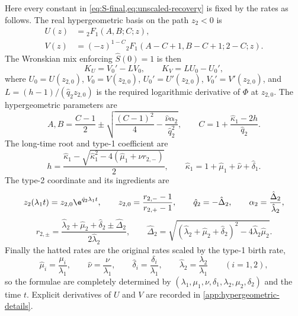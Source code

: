 \FloatBarrier

\begin{remark}
\label{note:parameter-map}
Here every constant in \cref{eq:S-final,eq:unscaled-recovery} is fixed by the rates as follows. The real hypergeometric basis on the path $z_2<0$ is
\begin{equation*}
\begin{aligned}
U(z)&={}_2F_1(A,B;C;z),\\
V(z)&=(-z)^{1-C}
{}_2F_1(A-C+1,B-C+1;2-C;z).
\end{aligned}
\end{equation*}
The Wronskian mix enforcing $\widehat S(0)=1$ is then
\begin{equation*}
K_U=V_0'-L V_0,
\qquad
K_V=L U_0-U_0',
\end{equation*}
where $U_0=U(z_{2,0})$, $V_0=V(z_{2,0})$, $U_0'=U'(z_{2,0})$, $V_0'=V'(z_{2,0})$, and $L=(h-1)/(\hat q_2z_{2,0})$ is the required logarithmic derivative of $\Phi$ at $z_{2,0}$. The hypergeometric parameters are
\begin{equation*}
A,B
=\frac{C-1}{2}\mathbin{\pm}
\sqrt{\frac{(C-1)^2}{4}
-\frac{\hat\nu\alpha_2}{\hat q_2^2}},
\qquad
C=1+\frac{\hat\kappa_1-2h}{\hat q_2}.
\end{equation*}
The long-time root and type-1 coefficient are
\begin{equation*}
h=\frac{\hat\kappa_1
-\sqrt{\hat\kappa_1^2-4(\hat\mu_1+\hat\nu r_{2,-})}}{2},
\qquad
\hat\kappa_1=1+\hat\mu_1+\hat\nu+\hat\delta_1.
\end{equation*}
The type-2 coordinate and its ingredients are
\begin{equation*}
z_2(\lambda_1t)=z_{2,0}\e^{\hat q_2\lambda_1t},
\qquad
z_{2,0}=\frac{r_{2,-}-1}{r_{2,+}-1},
\qquad
\hat q_2=-\hat\Delta_2,
\qquad
\alpha_2=\frac{\hat\Delta_2}{\hat\lambda_2},
\end{equation*}
\begin{equation*}
r_{2,\pm}
=\frac{\hat\lambda_2+\hat\mu_2+\hat\delta_2\pm\hat\Delta_2}{2\hat\lambda_2},
\qquad
\hat\Delta_2
=\sqrt{(\hat\lambda_2+\hat\mu_2+\hat\delta_2)^2-4\hat\lambda_2\hat\mu_2}.
\end{equation*}
Finally the hatted rates are the original rates scaled by the type-1 birth rate,
\begin{equation*}
\hat\mu_i=\frac{\mu_i}{\lambda_1},
\qquad
\hat\nu=\frac{\nu}{\lambda_1},
\qquad
\hat\delta_i=\frac{\delta_i}{\lambda_1},
\qquad
\hat\lambda_2=\frac{\lambda_2}{\lambda_1}
\qquad(i=1,2),
\end{equation*}
so the formulae are completely determined by $(\lambda_1,\mu_1,\nu,\delta_1,\lambda_2,\mu_2,\delta_2)$ and the time $t$. Explicit derivatives of $U$ and $V$ are recorded in \cref{app:hypergeometric-details}.
\end{remark}

